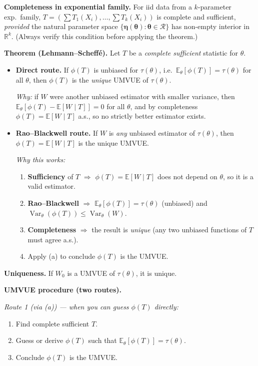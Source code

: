 \documentclass[11pt]{article}
\newcommand{\bbE}{\mathbb{E}}
\newcommand{\Var}{\operatorname{Var}}
\begin{document}
\medskip
\textbf{Completeness in exponential family.}
For iid data from a $k$-parameter exp.\ family, $T=(\sum T_1(X_i),\ldots,\sum T_k(X_i))$
is complete and sufficient, \emph{provided} the natural parameter space
$\{\boldsymbol\eta(\boldsymbol\theta):\boldsymbol\theta\in\mathcal{R}\}$
has non-empty interior in $\mathbb{R}^k$.
(Always verify this condition before applying the theorem.)

\medskip
\textbf{Theorem (Lehmann--Scheff\'e).}
Let $T$ be a \emph{complete sufficient} statistic for $\theta$.

\begin{itemize}
  \item[\textbf{(a)}] \textbf{Direct route.}
    If $\phi(T)$ is unbiased for $\tau(\theta)$, i.e.\
    $\bbE_\theta[\phi(T)]=\tau(\theta)$ for all $\theta$,
    then $\phi(T)$ is the \emph{unique} UMVUE of $\tau(\theta)$.

    \textit{Why:} if $W$ were another unbiased estimator with smaller variance,
    then $\bbE_\theta[\phi(T)-\bbE[W\mid T]]=0$ for all $\theta$, and
    by completeness $\phi(T)=\bbE[W\mid T]$ a.s., so no strictly better estimator exists.

  \item[\textbf{(b)}] \textbf{Rao--Blackwell route.}
    If $W$ is \emph{any} unbiased estimator of $\tau(\theta)$,
    then $\phi(T)=\bbE[W\mid T]$ is the unique UMVUE.

    \textit{Why this works:}
    \begin{enumerate}
      \item \textbf{Sufficiency} of $T$ $\Rightarrow$ $\phi(T)=\bbE[W\mid T]$ does not
        depend on $\theta$, so it is a valid estimator.
      \item \textbf{Rao--Blackwell} $\Rightarrow$ $\bbE_\theta[\phi(T)]=\tau(\theta)$
        (unbiased) and $\Var_\theta(\phi(T))\leq\Var_\theta(W)$.
      \item \textbf{Completeness} $\Rightarrow$ the result is \emph{unique}
        (any two unbiased functions of $T$ must agree a.s.).
      \item Apply (a) to conclude $\phi(T)$ is the UMVUE.
    \end{enumerate}
\end{itemize}

\textbf{Uniqueness.} If $W_0$ is a UMVUE of $\tau(\theta)$, it is unique.

\medskip
\noindent\textbf{UMVUE procedure (two routes).}

\noindent\textit{Route 1 (via (a)) — when you can guess $\phi(T)$ directly:}
\begin{enumerate}
  \item Find complete sufficient $T$.
  \item Guess or derive $\phi(T)$ such that $\bbE_\theta[\phi(T)]=\tau(\theta)$.
  \item Conclude $\phi(T)$ is the UMVUE.
\end{enumerate}
\end{document}
